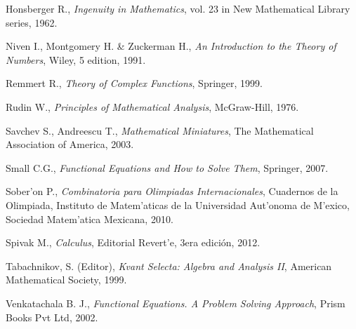 \begin{thebibliography}{99}
 Honsberger R.,
\textit{Ingenuity in Mathematics}, vol. 23 in New Mathematical Library 
series,  1962.


 Niven I., Montgomery H. \& Zuckerman H.,
\textit{An Introduction to the Theory of Numbers}, Wiley,  5 edition,  1991.


 Remmert R., \textit{Theory  of Complex Functions}, Springer,
 1999.
  
 Rudin W., \textit{Principles of Mathematical Analysis},
McGraw-Hill, 1976.

 Savchev S., Andreescu T., \textit{Mathematical Miniatures},
The Mathematical Association of America, 2003.

 Small C.G., 
\textit{Functional Equations and How to Solve Them}, Springer, 2007.

 Sober'on P., 
\textit{Combinatoria para Olimpiadas Internacionales}, Cuadernos de la Olimpiada, Instituto de Matem'aticas de la Universidad Aut'onoma de M'exico, Sociedad Matem'atica Mexicana,  2010.

 Spivak M., 
\textit{Calculus}, Editorial Revert'e, 3era edici\'on, 2012.

 Tabachnikov, S. (Editor), {\it Kvant Selecta: Algebra and 
Analysis II}, American Mathematical Society, 1999.

 Venkatachala B. J., \textit{Functional Equations. A
Problem Solving Approach}, Prism Books Pvt Ltd, 2002.

\end{thebibliography}
